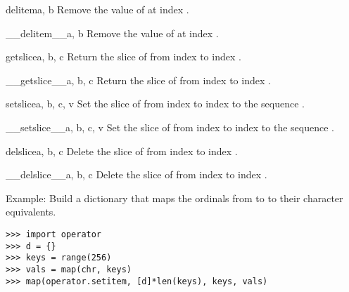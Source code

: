 \begin{funcdesc}{delitem}{a, b}
Remove the value of  at index .
\end{funcdesc}

\begin{funcdesc}{__delitem__}{a, b}
Remove the value of  at index .
\end{funcdesc}

\begin{funcdesc}{getslice}{a, b, c}
Return the slice of  from index  to index .
\end{funcdesc}

\begin{funcdesc}{__getslice__}{a, b, c}
Return the slice of  from index  to index .
\end{funcdesc}

\begin{funcdesc}{setslice}{a, b, c, v}
Set the slice of  from index  to index  to the
sequence .
\end{funcdesc}

\begin{funcdesc}{__setslice__}{a, b, c, v}
Set the slice of  from index  to index  to the
sequence .
\end{funcdesc}

\begin{funcdesc}{delslice}{a, b, c}
Delete the slice of  from index  to index .
\end{funcdesc}

\begin{funcdesc}{__delslice__}{a, b, c}
Delete the slice of  from index  to index .
\end{funcdesc}

Example: Build a dictionary that maps the ordinals from  to
 to their character equivalents.

\bcode\begin{verbatim}
>>> import operator
>>> d = {}
>>> keys = range(256)
>>> vals = map(chr, keys)
>>> map(operator.setitem, [d]*len(keys), keys, vals)
\end{verbatim}\ecode
